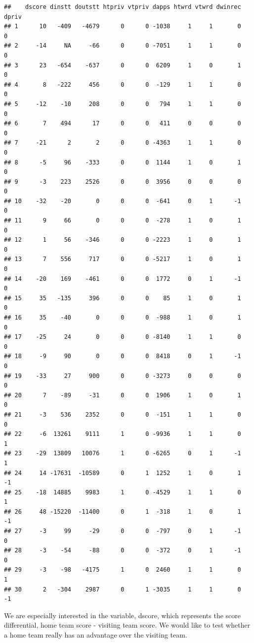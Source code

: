 \documentclass[
]{book}
\theoremstyle{definition}
\theoremstyle{definition}
\theoremstyle{definition}
\theoremstyle{definition}
\theoremstyle{remark}
\begin{document}
\begin{verbatim}
##    dscore dinstt doutstt htpriv vtpriv dapps htwrd vtwrd dwinrec dpriv
## 1      10   -409   -4679      0      0 -1038     1     1       0     0
## 2     -14     NA     -66      0      0 -7051     1     1       0     0
## 3      23   -654    -637      0      0  6209     1     0       1     0
## 4       8   -222     456      0      0  -129     1     1       0     0
## 5     -12    -10     208      0      0   794     1     1       0     0
## 6       7    494      17      0      0   411     0     0       0     0
## 7     -21      2       2      0      0 -4363     1     1       0     0
## 8      -5     96    -333      0      0  1144     1     0       1     0
## 9      -3    223    2526      0      0  3956     0     0       0     0
## 10    -32    -20       0      0      0  -641     0     1      -1     0
## 11      9     66       0      0      0  -278     1     0       1     0
## 12      1     56    -346      0      0 -2223     1     0       1     0
## 13      7    556     717      0      0 -5217     1     0       1     0
## 14    -20    169    -461      0      0  1772     0     1      -1     0
## 15     35   -135     396      0      0    85     1     0       1     0
## 16     35    -40       0      0      0  -988     1     0       1     0
## 17    -25     24       0      0      0 -8140     1     1       0     0
## 18     -9     90       0      0      0  8418     0     1      -1     0
## 19    -33     27     900      0      0 -3273     0     0       0     0
## 20      7    -89     -31      0      0  1906     1     0       1     0
## 21     -3    536    2352      0      0  -151     1     1       0     0
## 22     -6  13261    9111      1      0 -9936     1     1       0     1
## 23    -29  13809   10076      1      0 -6265     0     1      -1     1
## 24     14 -17631  -10589      0      1  1252     1     0       1    -1
## 25    -18  14885    9983      1      0 -4529     1     1       0     1
## 26     48 -15220  -11400      0      1  -318     1     0       1    -1
## 27     -3     99     -29      0      0  -797     0     1      -1     0
## 28     -3    -54     -88      0      0  -372     0     1      -1     0
## 29     -3    -98   -4175      1      0  2460     1     1       0     1
## 30      2   -304    2987      0      1 -3035     1     1       0    -1
\end{verbatim}

We are especially interested in the variable, dscore, which represents the score differential, home team score - visiting team score. We would like to test whether a home team really has an advantage over the visiting team.
\end{document}
